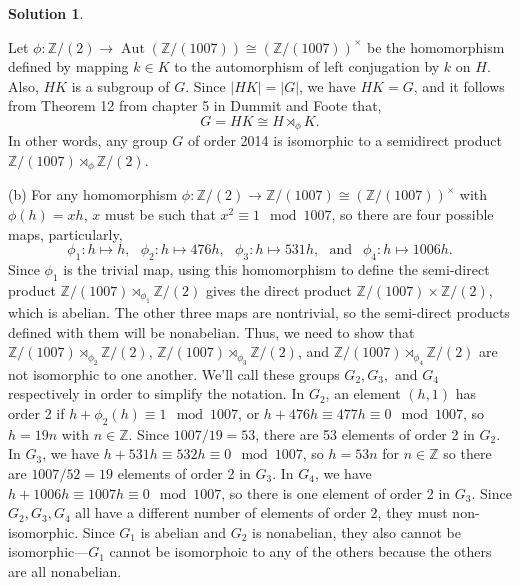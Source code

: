 \documentclass[10pt]{article}
\newcommand{\ZZ}{\mathbb Z}
\newcommand{\Aut}{\operatorname{Aut}}
\theoremstyle{Theorem}
\theoremstyle{definition}
\newtheorem{sol}{Solution}
\theoremstyle{remark}
\theoremstyle{custom}
\begin{document}
\begin{sol}
\begin{description}
Let $\phi: \ZZ/(2) \to \Aut (\ZZ/(1007))\cong (\ZZ/(1007))^{\times}$ be the homomorphism defined by mapping $k\in K$ to the automorphism of left conjugation by $k$ on $H$. Also, $HK$ is a subgroup of $G$. Since $|HK|=|G|$, we have $HK=G$, and it follows from Theorem 12 from chapter 5 in Dummit and Foote that, 
\[G=HK\cong H \rtimes_\phi K.  \]
In other words, any group $G$ of order 2014 is isomorphic to a semidirect product $\ZZ/(1007)\rtimes_\phi \ZZ/(2)$.
\item{(b)} For any homomorphism $\phi :\ZZ/(2)\to \ZZ/(1007)\cong (\ZZ/(1007))^\times$ with $\phi(h)=xh$, $x$ must be such that $x^2\equiv 1\mod 1007$, so there are four possible maps, particularly, 
\[\phi_1:h\mapsto h,~~~ \phi_2: h\mapsto 476h,~~~ \phi_3:  h\mapsto 531h,~~~\mbox{and }~~ \phi_4: h\mapsto 1006h. \]
Since $\phi_1$ is the trivial map, using this homomorphism to define the semi-direct product $\ZZ/(1007)\rtimes_{\phi_1} \ZZ/(2)$ gives the direct product $\ZZ/(1007)\times \ZZ/(2)$, which is abelian. The other three maps are nontrivial, so the semi-direct products defined with them will be nonabelian. Thus, we need to show that $\ZZ/(1007)\rtimes_{\phi_2} \ZZ/(2)$, $\ZZ/(1007)\rtimes_{\phi_3} \ZZ/(2)$, and $\ZZ/(1007)\rtimes_{\phi_4} \ZZ/(2)$ are not isomorphic to one another. We'll call these groups $G_2,G_3,$ and $G_4$ respectively in order to simplify the notation. In $G_2$, an element $(h,1)$ has order 2 if $h+\phi_2(h)\equiv 1\mod 1007$, or $h+476h\equiv 477h\equiv 0\mod 1007$, so $h=19n$ with $n\in \ZZ$. Since $1007/19=53$, there are 53 elements of order 2 in $G_2$. \\
In $G_3$, we have $h+531h\equiv 532h\equiv 0\mod 1007$, so $h=53n$ for $n\in \ZZ$ so there are $1007/52=19$ elements of order 2 in $G_3$. In $G_4$, we have $h+1006h\equiv 1007h\equiv 0\mod 1007$, so there is one element of order 2 in $G_3$. Since $G_2,G_3,G_4$ all have a different number of elements of order 2, they must non-isomorphic. Since $G_1$ is abelian and $G_2$ is nonabelian, they also cannot be isomorphic---$G_1$ cannot be isomorphoic to any of the others because the others are all nonabelian. 
\end{description}
\end{sol}
\end{document}
